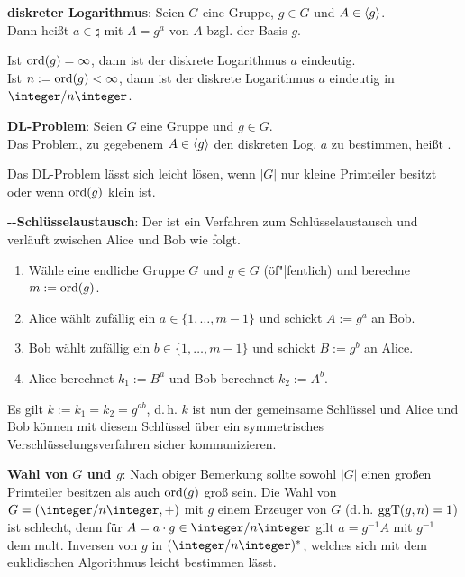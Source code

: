 \linie

\textbf{diskreter Logarithmus}:
Seien $G$ eine Gruppe, $g \in G$ und $A \in \langle g\rangle$.\\
Dann heißt $a \in \natural$ mit $A = g^a$  von $A$ bzgl. der
Basis $g$.

Ist $\operatorname{ord}(g) = \infty$, dann ist der diskrete Logarithmus $a$ eindeutig.\\
Ist $n := \operatorname{ord}(g) < \infty$, dann ist der diskrete Logarithmus $a$ eindeutig in $\ZnZ$.

\textbf{DL-Problem}:
Seien $G$ eine Gruppe und $g \in G$.\\
Das Problem, zu gegebenem $A \in \langle g\rangle$ den diskreten Log. $a$ zu bestimmen,
heißt .

Das DL-Problem lässt sich leicht lösen,
wenn $|G|$ nur kleine Primteiler besitzt oder wenn $\operatorname{ord}(g)$ klein ist.

\linie

\textbf{--Schlüsselaustausch}:
Der  ist ein Verfahren zum
Schlüsselaustausch und verläuft zwischen Alice und Bob wie folgt.
\begin{enumerate}
    \item
    Wähle eine endliche Gruppe $G$ und $g \in G$ (öf"|fentlich) und berechne $m := \operatorname{ord}(g)$.

    \item
    Alice wählt zufällig ein $a \in \{1, \dotsc, m - 1\}$ und schickt $A := g^a$ an Bob.

    \item
    Bob wählt zufällig ein $b \in \{1, \dotsc, m - 1\}$ und schickt $B := g^b$ an Alice.

    \item
    Alice berechnet $k_1 := B^a$ und Bob berechnet $k_2 := A^b$.
\end{enumerate}
Es gilt $k := k_1 = k_2 = g^{ab}$, d.\,h. $k$ ist nun der gemeinsame Schlüssel und Alice und Bob
können mit diesem Schlüssel über ein symmetrisches Verschlüsselungsverfahren sicher kommunizieren.

\linie

\textbf{Wahl von $G$ und $g$}:
Nach obiger Bemerkung sollte sowohl $|G|$ einen großen Primteiler besitzen als auch
$\operatorname{ord}(g)$ groß sein.
Die Wahl von $G = (\ZnZ, +)$ mit $g$ einem Erzeuger von $G$
(d.\,h. $\operatorname{ggT}(g, n) = 1$) ist schlecht, denn für
$A = a \cdot g \in \ZnZ$ gilt $a = g^{-1} A$ mit $g^{-1}$ dem mult. Inversen
von $g$ in $(\ZnZ)^\ast$, welches sich mit dem euklidischen Algorithmus leicht bestimmen lässt.

